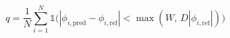 \documentclass[11pt]{article}
\begin{document}
\begin{equation*}
q = \frac{1}{N}\sum_{i=1}^{N} \mathbb{1}\bigl(|\phi_{i,\text{pred}} - \phi_{i,\text{ref}}| < \max(W,\, D|\phi_{i,\text{ref}}|)\bigr)\tag{12}
\end{equation*}
\end{document}
